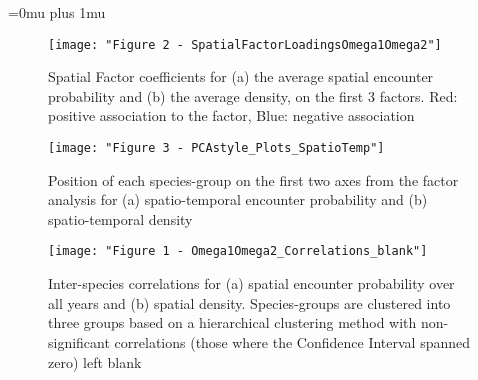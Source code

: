 \documentclass{nature}
\begin{document}
\newpage
\Urlmuskip=0mu plus 1mu\relax

\small{}






\begin{figure}
\begin{center}
	\texttt{[image: "Figure 2 - SpatialFactorLoadingsOmega1Omega2"]}
	\label{fig:1}
	\caption{Spatial Factor coefficients for (a) the average spatial encounter
		probability and (b) the average density,  on the first 3
		factors. Red: positive association to the factor, Blue:
		negative association}
\end{center}
\end{figure}


\begin{figure}
\begin{center}
	\texttt{[image: "Figure 3 - PCAstyle\_Plots\_SpatioTemp"]}
	\label{fig:2}
	\caption{Position of each species-group on the first two axes from the
		factor analysis for (a) spatio-temporal encounter probability
		and (b) spatio-temporal density}
\end{center}
\end{figure}

\begin{figure}
\begin{center}
	\texttt{[image: "Figure 1 - Omega1Omega2\_Correlations\_blank"]}
	\label{fig:3}
	\caption{Inter-species correlations for (a) spatial encounter
		probability over all years and (b) spatial density.
		Species-groups are clustered into three groups based on a
		hierarchical clustering method with non-significant
		correlations (those where the Confidence Interval spanned zero)
		left blank}
	\end{center}
\end{figure}
\end{document}
